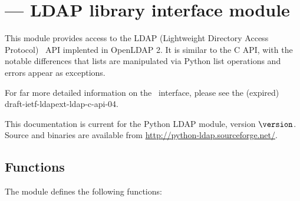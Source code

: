 

\section{ --- LDAP library interface module}






This module provides access to the LDAP
(Lightweight Directory Access Protocol) \C\ API implented
in OpenLDAP 2.
It is similar to the C API, with the notable differences
that lists are manipulated via Python
list operations and errors appear as exceptions.

For far more detailed information on the \C\ interface, 
please see the (expired) draft-ietf-ldapext-ldap-c-api-04.

This documentation is current for the Python LDAP module, version
$\version$.
Source and binaries are available from
\url{http://python-ldap.sourceforge.net/}.


\subsection{Functions}

The  module defines the following functions:

